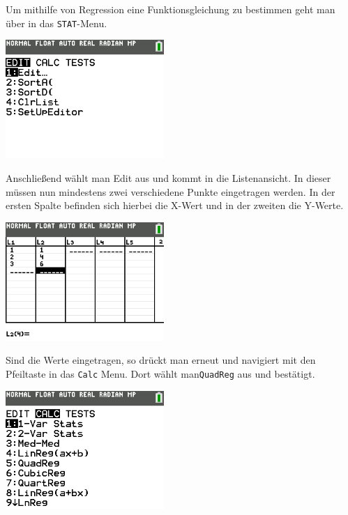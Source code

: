 \begin{paracol}{2}
\begin{flushleft}
	Um mithilfe von Regression eine Funktionsgleichung zu bestimmen geht man über  in das \texttt{STAT}-Menu.
\end{flushleft}	
\switchcolumn
\begin{flushright}
	\includegraphics[width=6cm]{Media/GRT/Visualisierung/Regression/Regression_1.png}
\end{flushright}
\end{paracol}

\begin{paracol}{2}
	\begin{flushleft}
	Anschließend wählt man Edit aus und kommt in die Listenansicht. In dieser müssen nun mindestens zwei verschiedene Punkte eingetragen werden. In der ersten Spalte befinden sich hierbei die X-Wert und in der zweiten die Y-Werte. 
	\end{flushleft}	
\switchcolumn
	\begin{flushright}
		\includegraphics[width=6cm]{Media/GRT/Visualisierung/Regression/Regression_5.png}
	\end{flushright}
\end{paracol}

\begin{paracol}{2}
	\begin{flushleft}
	Sind die Werte eingetragen, so drückt man erneut  und navigiert mit den Pfeiltaste in das \texttt{Calc} Menu. Dort wählt man\texttt{QuadReg} aus und bestätigt.
	\end{flushleft}	
\switchcolumn
	\begin{flushright}
		\includegraphics[width=6cm]{Media/GRT/Visualisierung/Regression/Regression_3.png}
	\end{flushright}
\end{paracol}

